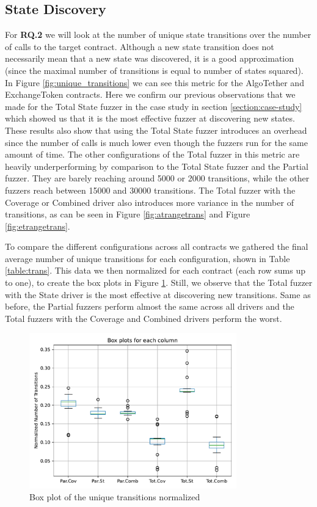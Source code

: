 \subsection*{State Discovery}
For \textbf{RQ.2} we will look at the number of unique state transitions over the number of calls to the target contract.
Although a new state transition does not necessarily mean that a new state was discovered, it is a good approximation (since the maximal number of transitions is equal to number of states squared).
In Figure \ref{fig:unique_transitions} we can see this metric for the AlgoTether and ExchangeToken contracts.
Here we confirm our previous observations that we made for the Total State fuzzer in the case study in section \ref{section:case-study} which showed us that it is the most effective fuzzer at discovering new states.
These results also show that using the Total State fuzzer introduces an overhead since the number of calls is much lower even though the fuzzers run for the same amount of time.
The other configurations of the Total fuzzer in this metric are heavily underperforming by comparison to the Total State fuzzer and the Partial fuzzer. They are barely reaching around 5000 or 2000 transitions, while the other fuzzers reach between 15000 and 30000 transitions. The Total fuzzer with the Coverage or Combined driver also introduces more variance in the number of transitions, as can be seen in Figure \ref{fig:atrangetrans} and Figure \ref{fig:etrangetrans}.

To compare the different configurations across all contracts we gathered the final average number of unique transitions for each configuration, shown in Table \ref{table:trans}.
This data we then normalized for each contract (each row sums up to one), to create the box plots in Figure \ref{fig:trans-box}.
Still, we observe that the Total fuzzer with the State driver is the most effective at discovering new transitions. Same as before, the Partial fuzzers perform almost the same across all drivers and the Total fuzzers with the Coverage and Combined drivers perform the worst.





\begin{figure}[t]
    \centering
    \includegraphics*[width=0.8\textwidth]{charts/trans-box.pdf}
    \caption{Box plot of the unique transitions normalized}\label{fig:trans-box}
\end{figure}

